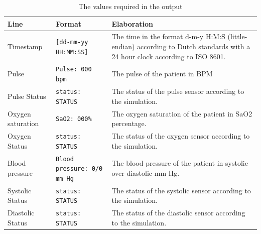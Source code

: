 \documentclass[a4paper]{article}
\newcommand{\arraystrechlength}{1.5}
\begin{document}
\begin{table}[H]
{\renewcommand{\arraystretch}{\arraystrechlength}
    \begin{tabular}{ | >{\columncolor{vu-grey-50}}m{95pt} | m{100pt} | m{170pt} | }
    
    \hline
    \rowcolor{vu-blue}
    \textcolor{vu-white}{\textbf{Line}} & 
    \textcolor{vu-white}{\textbf{Format}} & 
    \textcolor{vu-white}{\textbf{Elaboration}} \\ \hline
    
    Timestamp &
    \texttt{[dd-mm-yy HH:MM:SS]} &
    The time in the format d-m-y H:M:S (little-endian) according to Dutch standards with a 24 hour clock according to ISO 8601.
    \\ \hline
    
    Pulse &
    \texttt{Pulse: 000 bpm} &
    The pulse of the patient in BPM
    \\ \hline
    
    Pulse Status &
    \texttt{status: STATUS} &
    The status of the pulse sensor according to the simulation.
    \\ \hline
    
    Oxygen saturation &
    \texttt{SaO2: 000\%} &
    The oxygen saturation of the patient in SaO2 percentage.
    \\ \hline
    
    Oxygen Status &
    \texttt{status: STATUS} &
    The status of the oxygen sensor according to the simulation.
    \\ \hline
    
    Blood pressure &
    \texttt{Blood pressure: 0/0 mm Hg} &
    The blood pressure of the patient in systolic over diastolic mm Hg.
    \\ \hline
    
    Systolic Status &
    \texttt{status: STATUS} &
    The status of the systolic sensor according to the simulation.
    \\ \hline
    
    Diastolic Status &
    \texttt{status: STATUS} &
    The status of the diastolic sensor according to the simulation.
    \\ \hline
    
    \end{tabular}
}
\caption{The values required in the output}
\label{table:output_format}
\end{table}
\end{document}
